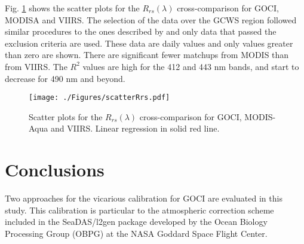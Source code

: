 \documentclass[10pt]{article}
\begin{document}
Fig. \ref{fig:scatterRrs} shows the scatter plots for the $R_{rs}(\lambda)$ cross-comparison for GOCI, MODISA and VIIRS. 
The selection of the data over the GCWS region followed similar procedures to the ones described by \cite{Bailey2006} and only data that passed the exclusion criteria are used. 
These data are daily values and only values greater than zero are shown. 
There are significant fewer matchups from MODIS than from VIIRS.
The $R^2$ values are high for the 412 and 443 nm bands, and start to decrease for 490 nm and beyond. 
\begin{figure}[H]
  \centering
  \texttt{[image: ./Figures/scatterRrs.pdf]}
    \caption{Scatter plots for the $R_{rs}(\lambda)$ cross-comparison for GOCI, MODIS-Aqua and VIIRS. Linear regression in solid red line. \label{fig:scatterRrs} } 
\end{figure}

\section{Conclusions}


Two approaches for the vicarious calibration for GOCI are evaluated in this study.
This calibration is particular to the atmospheric correction scheme included in the SeaDAS/l2gen package developed by the Ocean Biology Processing Group (OBPG) at the NASA Goddard Space Flight Center.
\end{document}
